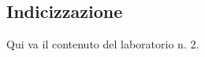 \documentclass{llncs}
\begin{document}

\subsection{Indicizzazione} \label{sec:metodi-di-indic}

Qui va il contenuto del laboratorio n. 2.
\end{document}
